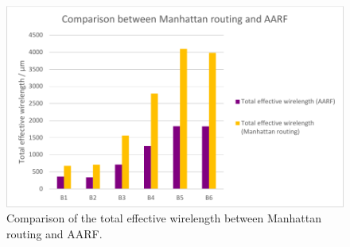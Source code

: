 \documentclass[journal]{IEEEtran}
\begin{document}
\begin{figure}
	\label{fig:mvab}
	\centering
	\includegraphics[width=0.95\columnwidth, angle=0]{./Figs/MR_vs_AARF_B.pdf}
	\vspace{-0.2cm}
	\caption{Comparison of the total effective wirelength between Manhattan routing and AARF.}
	\label{fig:mvab}
\end{figure}
\end{document}
